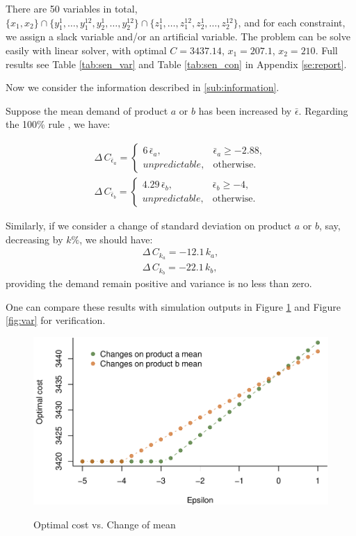 \documentclass[a4paper,11pt]{article}
\begin{document}
There are 50 variables in total, $\big\{ x_1,x_2 \big\} \cap \big\{ y_1^1,\dots,y_1^{12},y_2^1,\dots,y_2^{12} \big\} \cap \big\{ z_1^1,\dots,z_1^{12},z_2^1,\dots,z_2^{12} \big\}$, and for each constraint, we assign a slack variable and/or an artificial variable. The problem can be solve easily with linear solver, with optimal $C=3437.14$, $x_1=207.1$, $x_2=210$. Full results see Table \ref{tab:sen_var} and Table \ref{tab:sen_con} in Appendix \ref{se:report}.

Now we consider the information described in \ref{sub:information}.

Suppose the mean demand of product $a$ or $b$ has been increased by $\bar{\epsilon}$. Regarding the 100\% rule \cite{BHM77}, we have:

\[
\begin{aligned}
    \Delta \, C_{\bar{\epsilon}_a} = 
    \begin{cases}
        6 \, \bar{\epsilon}_a, & \bar{\epsilon}_a \geq -2.88,\\
        unpredictable, & \text{otherwise}.
    \end{cases}\\
    \Delta \, C_{\bar{\epsilon}_b} = 
    \begin{cases}
        4.29 \, \bar{\epsilon}_b, & \bar{\epsilon}_b \geq -4,\\
        unpredictable, & \text{otherwise}.
    \end{cases}
\end{aligned}
\]

Similarly, if we consider a change of standard deviation on product $a$ or $b$, say, decreasing by $k\%$, we should have:
\[
\begin{aligned}
    \Delta \, C_{k_a} = -12.1 \, k_a,\\
    \Delta \, C_{k_b} = -22.1 \, k_b,
\end{aligned}
\]
providing the demand remain positive and variance is no less than zero.

One can compare these results with simulation outputs in Figure \ref{fig:mean} and Figure \ref{fig:var} for verification.
\begin{figure}[ht]
\centering
\caption{Optimal cost vs. Change of mean}
\includegraphics{Example-figure_files/figure-latex/mean-1.pdf}
\label{fig:mean}
\end{figure}
\end{document}
